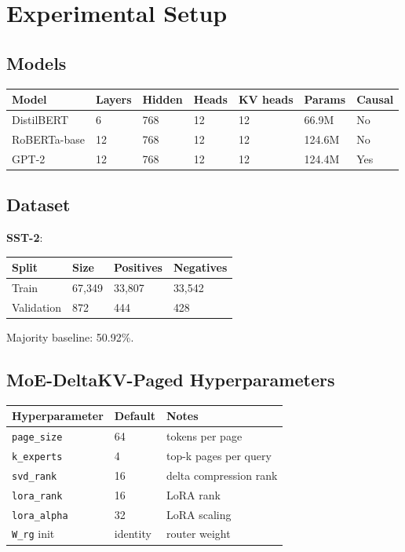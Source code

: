 \section{Experimental Setup}

\subsection{Models}

\begin{table}[H]
\centering
\small
\begin{tabular}{lllllll}
\toprule
\textbf{Model} & \textbf{Layers} & \textbf{Hidden} & \textbf{Heads} & \textbf{KV heads} & \textbf{Params} & \textbf{Causal} \\
\midrule
DistilBERT & 6 & 768 & 12 & 12 & 66.9M & No \\
RoBERTa-base & 12 & 768 & 12 & 12 & 124.6M & No \\
GPT-2 & 12 & 768 & 12 & 12 & 124.4M & Yes \\
\bottomrule
\end{tabular}
\end{table}

\subsection{Dataset}

\textbf{SST-2}:

\begin{table}[H]
\centering
\small
\begin{tabular}{llll}
\toprule
\textbf{Split} & \textbf{Size} & \textbf{Positives} & \textbf{Negatives} \\
\midrule
Train & 67,349 & 33,807 & 33,542 \\
Validation & 872 & 444 & 428 \\
\bottomrule
\end{tabular}
\end{table}

Majority baseline: 50.92\%.

\subsection{MoE-DeltaKV-Paged Hyperparameters}

\begin{table}[H]
\centering
\small
\begin{tabular}{lll}
\toprule
\textbf{Hyperparameter} & \textbf{Default} & \textbf{Notes} \\
\midrule
\texttt{page\_size} & 64 & tokens per page \\
\texttt{k\_experts} & 4 & top-k pages per query \\
\texttt{svd\_rank} & 16 & delta compression rank \\
\texttt{lora\_rank} & 16 & LoRA rank \\
\texttt{lora\_alpha} & 32 & LoRA scaling \\
\texttt{W\_rg} init & identity & router weight \\
\bottomrule
\end{tabular}
\end{table}

